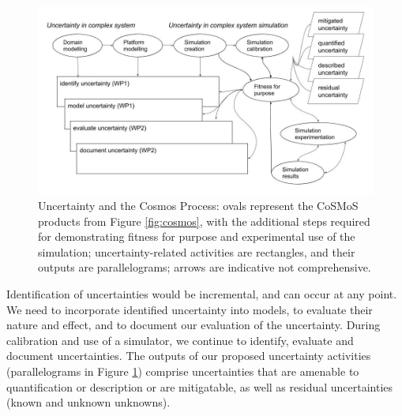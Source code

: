 \documentclass[sigconf,authordraft]{acmart}
\begin{document}
\begin{figure}[ht]
  \centering
  \includegraphics[width=\linewidth]{Process.jpg}
  \caption{Uncertainty and the Cosmos Process: ovals represent the CoSMoS products from Figure \ref{fig:cosmos}, with the additional steps required for demonstrating fitness for purpose and experimental use of the simulation; uncertainty-related activities are rectangles, and their outputs are parallelograms; arrows are indicative not comprehensive.}\label{fig:extended}
\end{figure}

Identification of uncertainties would be incremental, and can occur at any point.  We need to incorporate identified uncertainty into models, to evaluate their nature and effect, and to document our evaluation of the uncertainty.  During calibration and use of a simulator, we continue to identify, evaluate and document uncertainties. The outputs of our proposed uncertainty activities (parallelograms in Figure \ref{fig:extended}) comprise uncertainties that are amenable to quantification or description or are mitigatable, as well as residual uncertainties (known and unknown unknowns).  






\end{document}
